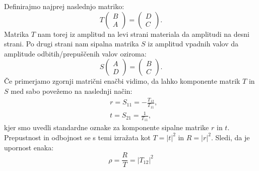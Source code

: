 \begin{appendices}
Definirajmo najprej naslednjo matriko:
\begin{equation}
T
\begin{pmatrix}
B \\ A
\end{pmatrix}
=
\begin{pmatrix}
D \\ C
\end{pmatrix}.
\end{equation}
Matrika $T$ nam torej iz amplitud na levi strani materiala da amplitudi na desni strani.
Po drugi strani nam sipalna matrika $S$ iz amplitud vpadnih valov da amplitude odbitih/prepuščenih valov oziroma:
\begin{equation}
S
\begin{pmatrix}
A \\ D
\end{pmatrix}
=
\begin{pmatrix}
B \\ C
\end{pmatrix}.
\end{equation}
Če primerjamo zgornji matrični enačbi vidimo, da lahko komponente matrik $T$ in $S$ med sabo povežemo na naslednji način:
\begin{align}
&r = S_{11} = -\frac{T_{12}}{T_{11}}, \\
&t = S_{21} = \frac{1}{T_{11}},
\end{align}
kjer smo uvedli standardne oznake za komponente sipalne matrike $r$ in $t$. Prepustnost in odbojnost se s temi izražata kot
$T = |t|^2$ in $R = |r|^2$.
Sledi, da je upornost enaka:
\begin{equation}
\rho = \frac{R}{T} = |T_{12}|^2
\end{equation}


\end{appendices}
